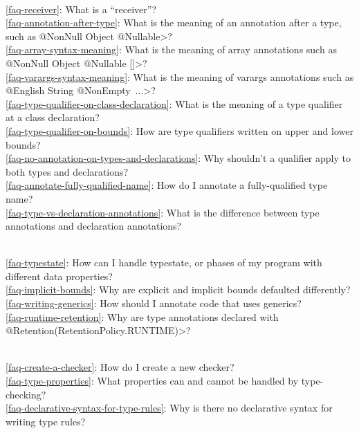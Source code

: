 \\ \ref{faq-receiver}: What is a ``receiver''?
\\ \ref{faq-annotation-after-type}: What is the meaning of an annotation after a type, such as \<@NonNull Object @Nullable>?
\\ \ref{faq-array-syntax-meaning}: What is the meaning of array annotations such as \<@NonNull Object @Nullable []>?
\\ \ref{faq-varargs-syntax-meaning}: What is the meaning of varargs annotations such as \<@English String @NonEmpty~...>?
\\ \ref{faq-type-qualifier-on-class-declaration}: What is the meaning of a type qualifier at a class declaration?
\\ \ref{faq-type-qualifier-on-bounds}: How are type qualifiers written on upper and lower bounds?
\\ \ref{faq-no-annotation-on-types-and-declarations}: Why shouldn't a qualifier apply to both types and declarations?
\\ \ref{faq-annotate-fully-qualified-name}: How do I annotate a
fully-qualified type name?
\\ \ref{faq-type-vs-declaration-annotations}: What is the difference between type annotations and declaration annotations?

\\ \ref{faq-typestate}: How can I handle typestate, or phases of my program with different data properties?
\\ \ref{faq-implicit-bounds}: Why are explicit and implicit bounds defaulted differently?
\\ \ref{faq-writing-generics}: How should I annotate code that uses generics?
\\ \ref{faq-runtime-retention}: Why are type annotations declared with \<@Retention(RetentionPolicy.RUNTIME)>?

\\ \ref{faq-create-a-checker}: How do I create a new checker?
\\ \ref{faq-type-properties}: What properties can and cannot be handled by type-checking?
\\ \ref{faq-declarative-syntax-for-type-rules}: Why is there no declarative syntax for writing type rules?


